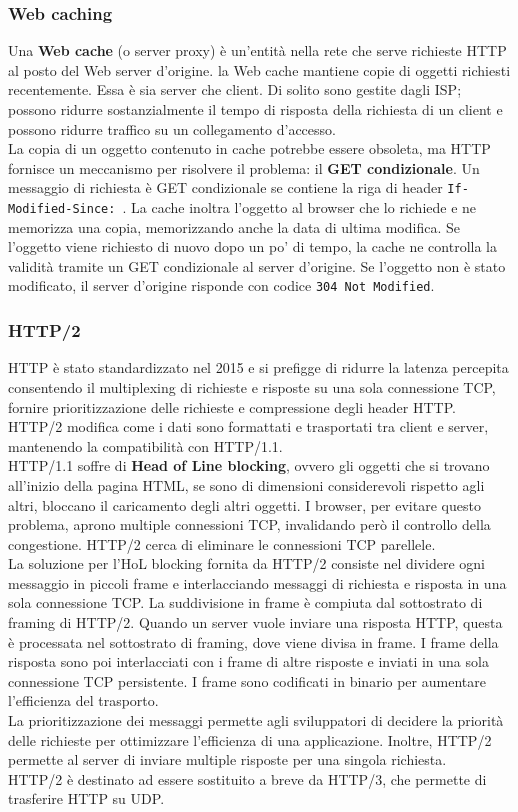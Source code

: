 \documentclass[11pt]{article}
\begin{document}
\subsubsection{Web caching}
Una \textbf{Web cache} (o server proxy) è un'entità nella rete che serve richieste HTTP al posto del Web server d'origine.
la Web cache mantiene copie di oggetti richiesti recentemente. Essa è sia server che client. Di solito sono gestite dagli
ISP; possono ridurre sostanzialmente il tempo di risposta della richiesta di un client e possono ridurre traffico su un 
collegamento d'accesso.\\
La copia di un oggetto contenuto in cache potrebbe essere obsoleta, ma HTTP fornisce un meccanismo per risolvere il
problema: il \textbf{GET condizionale}. Un messaggio di richiesta è GET condizionale se contiene la riga di header
\texttt{If-Modified-Since: }. La cache inoltra l'oggetto al browser che lo richiede e ne memorizza una copia, memorizzando
anche la data di ultima modifica. Se l'oggetto viene richiesto di nuovo dopo un po' di tempo, la cache ne controlla la
validità tramite un GET condizionale al server d'origine. Se l'oggetto non è stato modificato, il server d'origine
risponde con codice \texttt{304 Not Modified}.
\subsubsection{HTTP/2} 
HTTP è stato standardizzato nel 2015 e si prefigge di ridurre la latenza percepita consentendo il multiplexing di
richieste e risposte su una sola connessione TCP, fornire prioritizzazione delle richieste e compressione degli header
HTTP. HTTP/2 modifica come i dati sono formattati e trasportati tra client e server, mantenendo la compatibilità con 
HTTP/1.1.\\
HTTP/1.1 soffre di \textbf{Head of Line blocking}, ovvero gli oggetti che si trovano all'inizio della pagina HTML, se 
sono di dimensioni considerevoli rispetto agli altri, bloccano il caricamento degli altri oggetti. I browser, per evitare
questo problema, aprono multiple connessioni TCP, invalidando però il controllo della congestione. HTTP/2 cerca di 
eliminare le connessioni TCP parellele.\\
La soluzione per l'HoL blocking fornita da HTTP/2 consiste nel dividere ogni messaggio in piccoli frame e interlacciando
messaggi di richiesta e risposta in una sola connessione TCP. La suddivisione in frame è compiuta dal sottostrato di 
framing di HTTP/2. Quando un server vuole inviare una risposta HTTP, questa è processata nel sottostrato di framing, dove
viene divisa in frame. I frame della risposta sono poi interlacciati con i frame di altre risposte e inviati in una sola
connessione TCP persistente. I frame sono codificati in binario per aumentare l'efficienza del trasporto.\\
La prioritizzazione dei messaggi permette agli sviluppatori di decidere la priorità delle richieste per ottimizzare
l'efficienza di una applicazione.
Inoltre, HTTP/2 permette al server di inviare multiple risposte per una singola richiesta.\\
HTTP/2 è destinato ad essere sostituito a breve da HTTP/3, che permette di trasferire HTTP su UDP.
\end{document}

